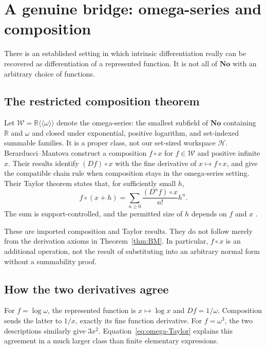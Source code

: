 \documentclass[11pt,a4paper]{article}
\numberwithin{equation}{section}
\theoremstyle{definition}
\theoremstyle{remark}
\newcommand{\No}{\mathbf{No}}
\newcommand{\R}{\mathbb R}
\newcommand{\HH}{\mathscr H}
\begin{document}
\section{A genuine bridge: omega-series and composition}
\label{sec:composition}

There is an established setting in which intrinsic differentiation really
can be recovered as differentiation of a represented function. It is not
all of $\No$ with an arbitrary choice of functions.

\subsection{The restricted composition theorem}

Let $\mathscr W=\R\langle\!\langle\omega\rangle\!\rangle$ denote the
omega-series: the smallest subfield of $\No$ containing $\R$ and $\omega$
and closed under exponential, positive logarithm, and set-indexed summable
families. It is a proper class, not our set-sized workspace $\HH$.
Berarducci--Mantova construct a composition $f\circ x$ for
$f\in\mathscr W$ and positive infinite $x$. Their results identify
$(Df)\circ x$ with the fine derivative of $x\mapsto f\circ x$, and give
the compatible chain rule when composition stays in the omega-series
setting. Their Taylor theorem states that, for sufficiently small $h$,
\begin{equation}\label{eq:omega-Taylor}
 f\circ(x+h)=\sum_{n\geq0}\frac{(D^nf)\circ x}{n!}h^n.
\end{equation}
The sum is support-controlled, and the permitted size of $h$ depends on
$f$ and $x$ \cite[Corollaries 7.6--7.7, Theorems 7.14 and 8.2]{BMGerms}.

These are imported composition and Taylor results. They do not follow
merely from the derivation axioms in Theorem~\ref{thm:BM}. In particular,
$f\circ x$ is an additional operation, not the result of substituting into
an arbitrary normal form without a summability proof.

\subsection{How the two derivatives agree}

For $f=\log\omega$, the represented function is $x\mapsto\log x$ and
$Df=1/\omega$. Composition sends the latter to $1/x$, exactly its fine
function derivative. For $f=\omega^3$, the two descriptions similarly give
$3x^2$. Equation~\eqref{eq:omega-Taylor} explains this agreement in a
much larger class than finite elementary expressions.
\end{document}
